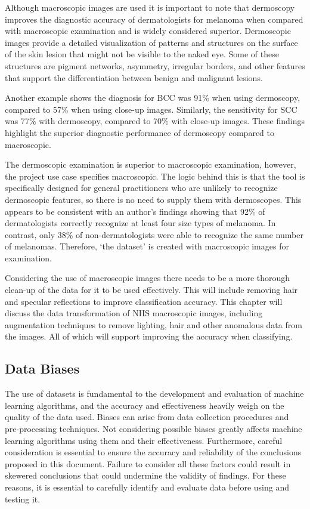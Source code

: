 Although macroscopic images are used it is important to note that dermoscopy improves the diagnostic accuracy of dermatologists for melanoma when compared with macroscopic examination\cite{Wolner2017} and is widely considered superior\cite{Thiers2009}. Dermoscopic images provide a detailed visualization of patterns and structures on the surface of the skin lesion that might not be visible to the naked eye\cite{Thiers2009}. Some of these structures are pigment networks, asymmetry, irregular borders, and other features that support the differentiation between benign and malignant lesions\cite{Thiers2009}.

Another example shows the diagnosis for BCC was 91\% when using dermoscopy, compared to 57\% when using close-up images\cite{Dascalu2022}. Similarly, the sensitivity for SCC was 77\% with dermoscopy, compared to 70\% with close-up images\cite{Dascalu2022}. These findings highlight the superior diagnostic performance of dermoscopy compared to macroscopic.

The dermoscopic examination is superior to macroscopic examination, however, the project use case specifies macroscopic. The logic behind this is that the tool is specifically designed for general practitioners who are unlikely to recognize dermoscopic features, so there is no need to supply them with dermoscopes. This appears to be consistent with an author's findings showing that 92\% of dermatologists correctly recognize at least four size types of melanoma. In contrast, only 38\% of non-dermatologists were able to recognize the same number of melanomas\cite{Tae2019}. Therefore, `the dataset' is created with macroscopic images for examination.

Considering the use of macroscopic images there needs to be a more thorough clean-up of the data for it to be used effectively. This will include removing hair and specular reflections to improve classification accuracy. This chapter will discuss the data transformation of NHS macroscopic images, including augmentation techniques to remove lighting, hair and other anomalous data from the images. All of which will support improving the accuracy when classifying.

\subsection{Data Biases}
The use of datasets is fundamental to the development and evaluation of machine learning algorithms, and the accuracy and effectiveness heavily weigh on the quality of the data used. Biases can arise from data collection procedures and pre-processing techniques. Not considering possible biases greatly affects machine learning algorithms using them and their effectiveness. Furthermore, careful consideration is essential to ensure the accuracy and reliability of the conclusions proposed in this document. Failure to consider all these factors could result in skewered conclusions that could undermine the validity of findings. For these reasons, it is essential to carefully identify and evaluate data before using and testing it.

